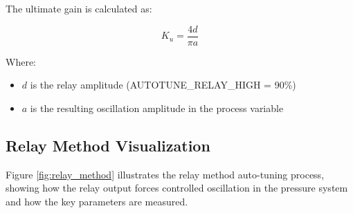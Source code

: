 \documentclass[a4paper,11pt]{article}
\begin{document}
The ultimate gain is calculated as:

\begin{equation}
K_u = \frac{4d}{\pi a}
\end{equation}

Where:
\begin{itemize}
    \item $d$ is the relay amplitude (AUTOTUNE\_RELAY\_HIGH = 90\%)
    \item $a$ is the resulting oscillation amplitude in the process variable
\end{itemize}

\subsection{Relay Method Visualization}

Figure \ref{fig:relay_method} illustrates the relay method auto-tuning process, showing how the relay output forces controlled oscillation in the pressure system and how the key parameters are measured.
\end{document}
